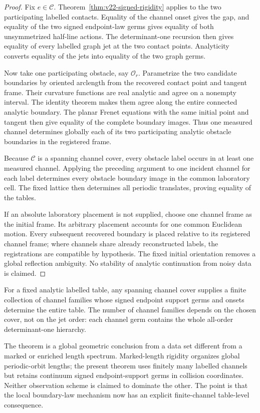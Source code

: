 \begin{proof}
Fix $e\in\mathscr C$.  Theorem~\ref{thm:v22-signed-rigidity} applies to the
two participating labelled contacts.  Equality of the channel onset gives
the gap, and equality of the two signed endpoint-law germs gives equality of
both unsymmetrized half-line actions.  The determinant-one recursion then
gives equality of every labelled graph jet at the two contact points.
Analyticity converts equality of the jets into equality of the two graph
germs.

Now take one participating obstacle, say $\mathcal O_r$.  Parametrize the two
candidate boundaries by oriented arclength from the recovered contact point
and tangent frame.  Their curvature functions are real analytic and agree on
a nonempty interval.  The identity theorem makes them agree along the entire
connected analytic boundary.  The planar Frenet equations with the same
initial point and tangent then give equality of the complete boundary images.
Thus one measured channel determines globally each of its two participating
analytic obstacle boundaries in the registered frame.

Because $\mathscr C$ is a spanning channel cover, every obstacle label occurs
in at least one measured channel.  Applying the preceding argument to one
incident channel for each label determines every obstacle boundary image in
the common laboratory cell.  The fixed lattice then determines all periodic
translates, proving equality of the tables.

If an absolute laboratory placement is not supplied, choose one channel frame
as the initial frame.  Its arbitrary placement accounts for one common
Euclidean motion.  Every subsequent recovered boundary is placed relative to
its registered channel frame; where channels share already reconstructed
labels, the registrations are compatible by hypothesis.  The fixed initial
orientation removes a global reflection ambiguity.  No stability of analytic
continuation from noisy data is claimed.
\end{proof}

\begin{corollary}
\label{cor:v22-finite-channel-global-recovery}
For a fixed analytic labelled table, any spanning channel cover supplies a
finite collection of channel families whose signed endpoint support germs and
onsets determine the entire table.  The number of channel families depends on
the chosen cover, not on the jet order: each channel germ contains the whole
all-order determinant-one hierarchy.
\end{corollary}

\begin{remark}
The theorem is a global geometric conclusion from a data set different from a
marked or enriched length spectrum.  Marked-length rigidity organizes global
periodic-orbit lengths; the present theorem uses finitely many labelled
channels but retains continuum signed endpoint-support germs in collision
coordinates.  Neither observation scheme is claimed to dominate the other.
The point is that the local boundary-law mechanism now has an explicit
finite-channel table-level consequence.
\end{remark}

